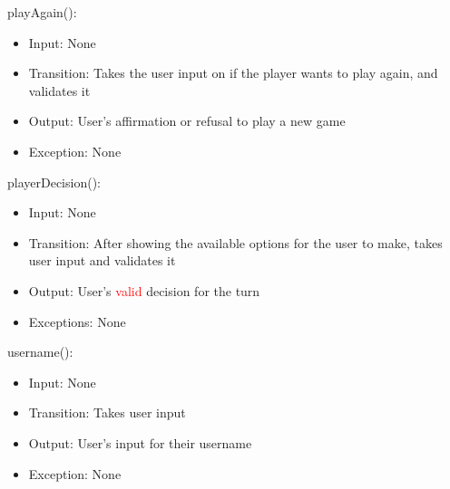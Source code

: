 \documentclass[12pt, titlepage]{article}
\begin{document}
\noindent playAgain():
\begin{itemize}
    \item Input: None
    \item Transition: Takes the user input on if the player wants to play again, and validates it
    \item Output: User's affirmation or refusal to play a new game
    \item Exception: None
\end{itemize}

\noindent playerDecision():
\begin{itemize}
    \item Input: None
    \item Transition: After showing the available options for the user to make, takes user input and validates it
    \item Output: User's \textcolor{red}{valid} decision for the turn
    \item Exceptions: None
\end{itemize}

\noindent username():
\begin{itemize}
    \item Input: None
    \item Transition: Takes user input
    \item Output: User's input for their username
    \item Exception: None
\end{itemize}
\end{document}
